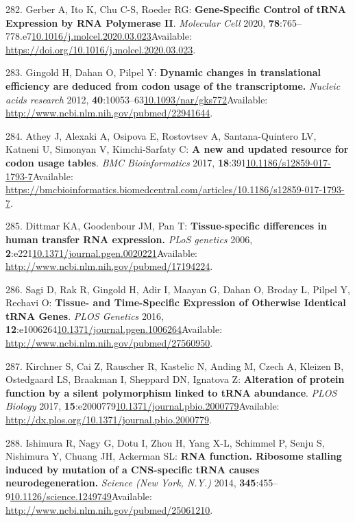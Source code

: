 \documentclass[
]{book}
\begin{document}
\leavevmode\hypertarget{ref-Gerber2020}{}%
282. Gerber A, Ito K, Chu C-S, Roeder RG: \textbf{Gene-Specific Control of tRNA Expression by RNA Polymerase II}. \emph{Molecular Cell} 2020, \textbf{78}:765--778.e7\href{https://doi.org/10.1016/j.molcel.2020.03.023}{10.1016/j.molcel.2020.03.023}Available: \url{https://doi.org/10.1016/j.molcel.2020.03.023}.

\leavevmode\hypertarget{ref-Gingold2012}{}%
283. Gingold H, Dahan O, Pilpel Y: \textbf{Dynamic changes in translational efficiency are deduced from codon usage of the transcriptome.} \emph{Nucleic acids research} 2012, \textbf{40}:10053--63\href{https://doi.org/10.1093/nar/gks772}{10.1093/nar/gks772}Available: \url{http://www.ncbi.nlm.nih.gov/pubmed/22941644}.

\leavevmode\hypertarget{ref-Athey2017}{}%
284. Athey J, Alexaki A, Osipova E, Rostovtsev A, Santana-Quintero LV, Katneni U, Simonyan V, Kimchi-Sarfaty C: \textbf{A new and updated resource for codon usage tables}. \emph{BMC Bioinformatics} 2017, \textbf{18}:391\href{https://doi.org/10.1186/s12859-017-1793-7}{10.1186/s12859-017-1793-7}Available: \url{https://bmcbioinformatics.biomedcentral.com/articles/10.1186/s12859-017-1793-7}.

\leavevmode\hypertarget{ref-Dittmar2006}{}%
285. Dittmar KA, Goodenbour JM, Pan T: \textbf{Tissue-specific differences in human transfer RNA expression.} \emph{PLoS genetics} 2006, \textbf{2}:e221\href{https://doi.org/10.1371/journal.pgen.0020221}{10.1371/journal.pgen.0020221}Available: \url{http://www.ncbi.nlm.nih.gov/pubmed/17194224}.

\leavevmode\hypertarget{ref-Sagi2016}{}%
286. Sagi D, Rak R, Gingold H, Adir I, Maayan G, Dahan O, Broday L, Pilpel Y, Rechavi O: \textbf{Tissue- and Time-Specific Expression of Otherwise Identical tRNA Genes}. \emph{PLOS Genetics} 2016, \textbf{12}:e1006264\href{https://doi.org/10.1371/journal.pgen.1006264}{10.1371/journal.pgen.1006264}Available: \url{http://www.ncbi.nlm.nih.gov/pubmed/27560950}.

\leavevmode\hypertarget{ref-Kirchner2017}{}%
287. Kirchner S, Cai Z, Rauscher R, Kastelic N, Anding M, Czech A, Kleizen B, Ostedgaard LS, Braakman I, Sheppard DN, Ignatova Z: \textbf{Alteration of protein function by a silent polymorphism linked to tRNA abundance}. \emph{PLOS Biology} 2017, \textbf{15}:e2000779\href{https://doi.org/10.1371/journal.pbio.2000779}{10.1371/journal.pbio.2000779}Available: \url{http://dx.plos.org/10.1371/journal.pbio.2000779}.

\leavevmode\hypertarget{ref-Ishimura2015}{}%
288. Ishimura R, Nagy G, Dotu I, Zhou H, Yang X-L, Schimmel P, Senju S, Nishimura Y, Chuang JH, Ackerman SL: \textbf{RNA function. Ribosome stalling induced by mutation of a CNS-specific tRNA causes neurodegeneration.} \emph{Science (New York, N.Y.)} 2014, \textbf{345}:455--9\href{https://doi.org/10.1126/science.1249749}{10.1126/science.1249749}Available: \url{http://www.ncbi.nlm.nih.gov/pubmed/25061210}.
\end{document}
